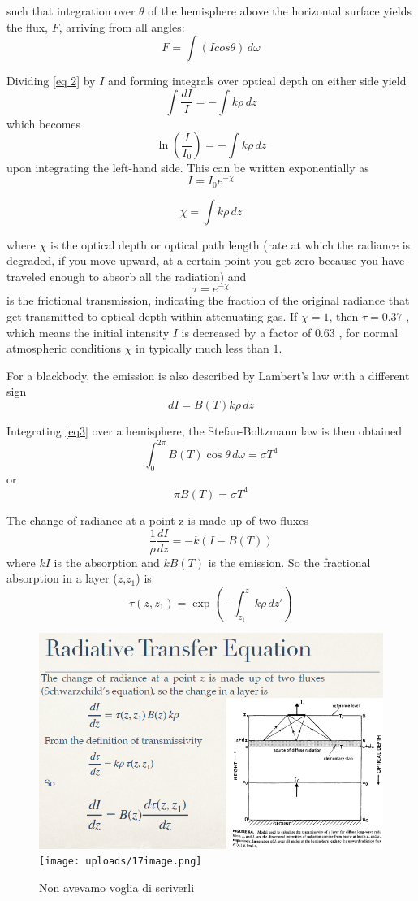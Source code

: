 such that integration over $\theta$ of the hemisphere above the horizontal surface yields the flux, $F$, arriving from all angles:
\begin{equation}\label{eq 2}
	F=\int(Icos\theta )\,d\omega
\end{equation}

Dividing \ref{eq 2} by $I$ and forming integrals over optical depth on either side yield
$$\int \frac{dI}{I} = - \int k \rho \, dz$$ which becomes $$\ln \left( \frac{I}{I_0} \right) = - \int k \rho \, dz$$
upon integrating the left-hand side.
This can be written exponentially as $$I = I_0 e^{-\chi}$$

$$\chi=\int k \rho \,dz $$


where $\chi$ is the optical depth or optical path length (rate at which the radiance is degraded, if you move upward, at a certain point you get zero because you have traveled enough to absorb all the radiation)  and
$$\tau = e^{-\chi}$$
is the frictional transmission, indicating the fraction of the original radiance that get transmitted to optical depth within attenuating gas. If $\chi=1$, then $\tau=0.37$ , which means the initial intensity $I$ is decreased by a factor of $0.63$ , for normal atmospheric conditions $\chi$ in typically much less than $1$.


For a blackbody, the emission is also described by Lambert's law with a different sign
\begin{equation}\label{eq3}
	dI = B(T) k \rho \, dz
\end{equation}

Integrating \ref{eq3} over a hemisphere, the Stefan-Boltzmann law is then obtained
$$\int_0^{2\pi} B(T) \cos \theta \, d\omega = \sigma T^4$$
or $$\pi B(T) = \sigma T^4$$

The change of radiance at a point z is made up of two fluxes
$$\frac{1}{\rho} \frac{dI}{dz} = -k (I - B(T))$$ where $kI$ is the absorption and $kB(T)$ is the emission.
So the fractional absorption in a layer ($z$,$z_1$) is $$\tau(z, z_1) = \exp \left( - \int_{z_1}^z k \rho \, dz' \right)$$
\begin{figure}[htbp]
	\centering
	\includegraphics[width=0.35\linewidth]{upload/16image.png}\quad\texttt{[image: uploads/17image.png]}
	\caption{Non avevamo voglia di scriverli}

\end{figure}




